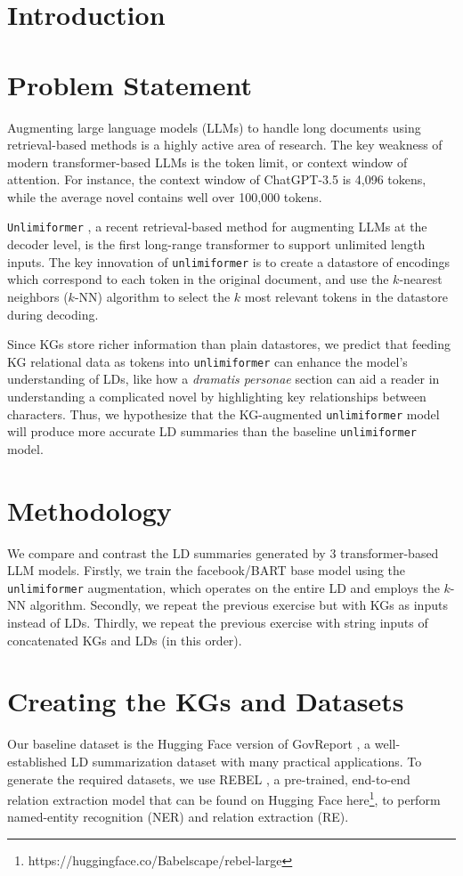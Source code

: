 \documentclass[12pt]{article}
\begin{document}
\section{Introduction} 
\section{Problem Statement}

Augmenting large language models (LLMs) to handle long documents using
retrieval-based methods is a highly active area of research. The key weakness
of modern transformer-based LLMs is the token limit, or context window of
attention. For instance, the context window of ChatGPT-3.5 is 4,096 tokens,
while the average novel contains well over 100,000 tokens.

\texttt{Unlimiformer} \cite{bertsch2023unlimiformer}, a recent retrieval-based
method for augmenting LLMs at the decoder level, is the first long-range
transformer to support unlimited length inputs. The key innovation of
\texttt{unlimiformer} is to create a datastore of encodings which correspond to
each token in the original document, and use the $k$-nearest neighbors ($k$-NN)
algorithm to select the $k$ most relevant tokens in the datastore during
decoding.

Since KGs store richer information than plain datastores, we predict that
feeding KG relational data as tokens into \texttt{unlimiformer} can enhance the
model's understanding of LDs, like how a \textit{dramatis personae} section can
aid a reader in understanding a complicated novel by highlighting key
relationships between characters. Thus, we hypothesize that the KG-augmented
\texttt{unlimiformer} model will produce more accurate LD summaries than the
baseline \texttt{unlimiformer} model.

\section{Methodology}
We compare and contrast the LD summaries generated by 3 transformer-based LLM
models. Firstly, we train the facebook/BART base model using the
\texttt{unlimiformer} augmentation, which operates on the entire LD and employs
the $k$-NN algorithm. Secondly, we repeat the previous exercise but with KGs as
inputs instead of LDs. Thirdly, we repeat the previous exercise with string
inputs of concatenated KGs and LDs (in this order).

\section{Creating the KGs and Datasets}
Our baseline dataset is the Hugging Face version of GovReport
\cite{huang2021efficient}, a well-established LD summarization dataset with
many practical applications. To generate the required datasets, we use REBEL
\cite{huguet2021rebel}, a pre-trained, end-to-end relation extraction model
that can be found on Hugging Face
here\footnote{https://huggingface.co/Babelscape/rebel-large}, to perform
named-entity recognition (NER) and relation extraction (RE).
\end{document}
